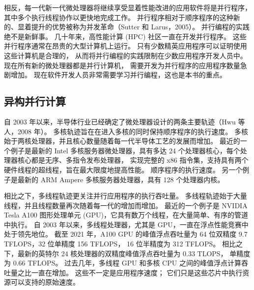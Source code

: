 相反，每一代新一代微处理器将继续享受显着性能改进的应用软件将是并行程序，其中多个执行线程协作以更快地完成工作。 
并行程序相对于顺序程序的这种新的、显着提升的优势被称为并发革命（Sutter 和 Larus，2005）。 
并行编程的实践绝不是新鲜事。 几十年来，高性能计算 (HPC) 社区一直在开发并行程序。 
这些并行程序通常在昂贵的大型计算机上运行。 只有少数精英应用程序可以证明使用这些计算机是合理的，
从而将并行编程的实践限制在少数应用程序开发人员中。 现在所有新的微处理器都是并行计算机，
需要开发为并行程序的应用程序数量急剧增加。 现在软件开发人员非常需要学习并行编程，这也是本书的重点。

\subsection{异构并行计算}
自 2003 年以来，半导体行业已经确定了微处理器设计的两条主要轨迹（Hwu 等人，2008 年）。 
多核轨迹旨在在进入多核的同时保持顺序程序的执行速度。 多核始于两核处理器，并且核心数量随着每一代半导体工艺的发展而增加。 
最近的一个例子是最新的 Intel 多核服务器微处理器，具有多达 24 个处理器核心，每个处理器核心都是无序、多指令发布处理器，
实现完整的 x86 指令集，支持具有两个硬件线程的超线程，旨在最大限度地提高性能。 顺序程序的执行速度。 
另一个例子是最新的 ARM Ampere 多核服务器处理器，具有 128 个处理器内核。

相比之下，多线程轨迹更关注并行应用程序的执行吞吐量。 多线程轨迹始于大量线程，并且线程数量再次随着每一代的增加而增加。 
最近的一个例子是 NVIDIA Tesla A100 图形处理单元 (GPU)，它具有数万个线程，在大量简单、有序的管道中执行。 
自 2003 年以来，多线程处理器，尤其是 GPU，一直在浮点性能竞赛中处于领先地位。
截至 2021 年，A100 GPU 的峰值浮点吞吐量为 64 位双精度 9.7 TFLOPS，32 位单精度 156 TFLOPS，
16 位半精度为 312 TFLOPS。 相比之下，最新的英特尔 24 核处理器的双精度峰值浮点吞吐量为 0.33 TLOPS，
单精度为 0.66 TFLOPS。 过去几年，多线程 GPU 和多核 CPU 之间的峰值浮点计算吞吐量之比一直在增加。 
这些不一定是应用程序速度； 它们只是这些芯片中执行资源可以支持的原始速度。

